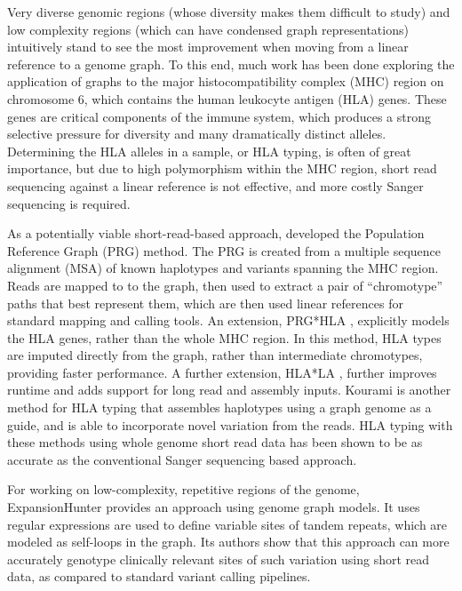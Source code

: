 Very diverse genomic regions (whose diversity makes them difficult to study) and low complexity regions (which can have condensed graph representations) intuitively stand to see the most improvement when moving from a linear reference to a genome graph.
To this end, much work has been done exploring the application of graphs to the major histocompatibility complex (MHC) region on chromosome 6, which contains the human leukocyte antigen (HLA) genes.
These genes are critical components of the immune system, which produces a strong selective pressure for diversity and many dramatically distinct alleles.
Determining the HLA alleles in a sample, or HLA typing, is often of great importance, but due to high polymorphism within the MHC region, short read sequencing against a linear reference is not effective, and more costly Sanger sequencing is required.

As a potentially viable short-read-based approach, \citeauthor{dilthey2015improved} developed the Population Reference Graph (PRG) method.
The PRG is created from a multiple sequence alignment (MSA) of known haplotypes and variants spanning the MHC region.
Reads are mapped to to the graph, then used to extract a pair of ``chromotype'' paths that best represent them, which are then used linear references for standard mapping and calling tools.
An extension, PRG*HLA \cite{dilthey2018hla}, explicitly models the HLA genes, rather than the whole MHC region.
In this method, HLA types are imputed directly from the graph, rather than intermediate chromotypes, providing faster performance.
A further extension, HLA*LA \cite{dilthey2019hla}, further improves runtime and adds support for long read and assembly inputs.
Kourami \cite{lee2018kourami} is another method for HLA typing that assembles haplotypes using a graph genome as a guide, and is able to incorporate novel variation from the reads.
HLA typing with these methods using whole genome short read data has been shown to be as accurate as the conventional Sanger sequencing based approach.

For working on low-complexity, repetitive regions of the genome, ExpansionHunter \cite{dolzhenko2019expansionhunter} provides an approach using genome graph models.
It uses regular expressions are used to define variable sites of tandem repeats, which are modeled as self-loops in the graph.
Its authors show that this approach can more accurately genotype clinically relevant sites of such variation using short read data, as compared to standard variant calling pipelines.

